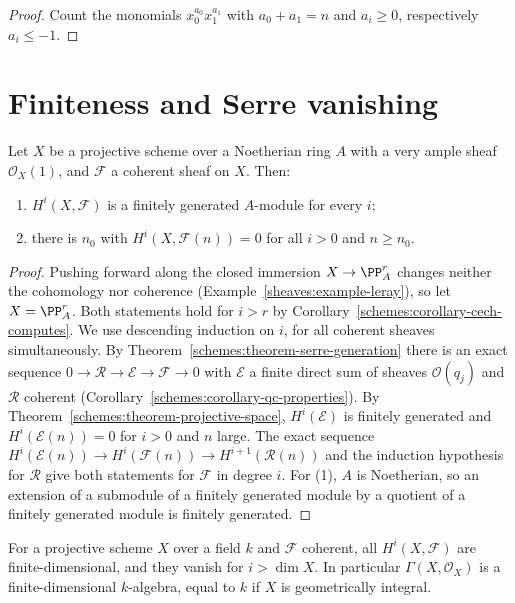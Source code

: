\begin{proof}
Count the monomials $x_0^{a_0}x_1^{a_1}$ with $a_0 + a_1 = n$ and $a_i \geq 0$, respectively $a_i \leq -1$.
\end{proof}

\section{Finiteness and Serre vanishing}\label{schemes:section-finiteness}

\begin{theorem}[Serre]\label{schemes:theorem-finiteness}
Let $X$ be a projective scheme over a Noetherian ring $A$ with a very ample sheaf $\mathcal{O}_X(1)$, and $\mathcal{F}$ a coherent sheaf on $X$. Then:
\begin{enumerate}
\item $H^i(X, \mathcal{F})$ is a finitely generated $A$-module for every $i$;
\item there is $n_0$ with $H^i(X, \mathcal{F}(n)) = 0$ for all $i > 0$ and $n \geq n_0$.
\end{enumerate}
\end{theorem}

\begin{proof}
Pushing forward along the closed immersion $X \to \PP^r_A$ changes neither the cohomology nor coherence (Example~\ref{sheaves:example-leray}), so
let $X = \PP^r_A$. Both statements hold for $i > r$ by Corollary~\ref{schemes:corollary-cech-computes}. We use descending induction on $i$, for all
coherent sheaves simultaneously. By Theorem~\ref{schemes:theorem-serre-generation} there is an exact sequence $0 \to \mathcal{R} \to \mathcal{E} \to \mathcal{F} \to 0$
with $\mathcal{E}$ a finite direct sum of sheaves $\mathcal{O}(q_j)$ and $\mathcal{R}$ coherent (Corollary~\ref{schemes:corollary-qc-properties}). By
Theorem~\ref{schemes:theorem-projective-space}, $H^i(\mathcal{E})$ is finitely generated and $H^i(\mathcal{E}(n)) = 0$ for $i > 0$ and $n$ large. The exact
sequence $H^i(\mathcal{E}(n)) \to H^i(\mathcal{F}(n)) \to H^{i+1}(\mathcal{R}(n))$ and the induction hypothesis for $\mathcal{R}$ give both statements for $\mathcal{F}$ in degree
$i$. For (1), $A$ is Noetherian, so an extension of a submodule of a finitely generated module by a quotient of a finitely generated module is
finitely generated.
\end{proof}

\begin{corollary}\label{schemes:corollary-finite-dimensional}
For a projective scheme $X$ over a field $k$ and $\mathcal{F}$ coherent, all $H^i(X, \mathcal{F})$ are finite-dimensional, and they vanish for $i > \dim X$. In particular
$\Gamma(X, \mathcal{O}_X)$ is a finite-dimensional $k$-algebra, equal to $k$ if $X$ is geometrically integral.
\end{corollary}

